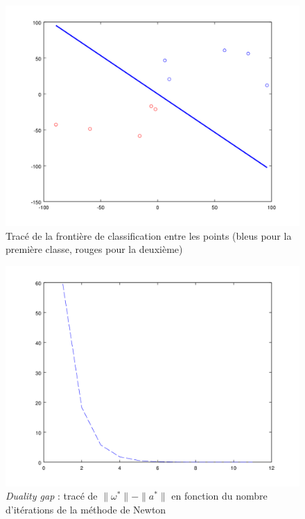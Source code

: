 \documentclass{article}
\begin{document}
         \begin{figure}
           \begin{center}
             \subfigure\includegraphics[scale=0.5]{images/line2D1.png}
             \caption{Tracé de la frontière de classification entre les points (bleus pour la première classe, rouges pour la deuxième)}
           \end{center}
         \end{figure}

         \begin{figure}
           \begin{center}
             \subfigure\includegraphics[scale=0.5]{images/dualitygap1.png}
             \caption{\emph{Duality gap} : tracé de $\|\omega^*\| - \|a^*\|$ en fonction du nombre d'itérations de la méthode de Newton}
           \end{center}
         \end{figure}
\end{document}
